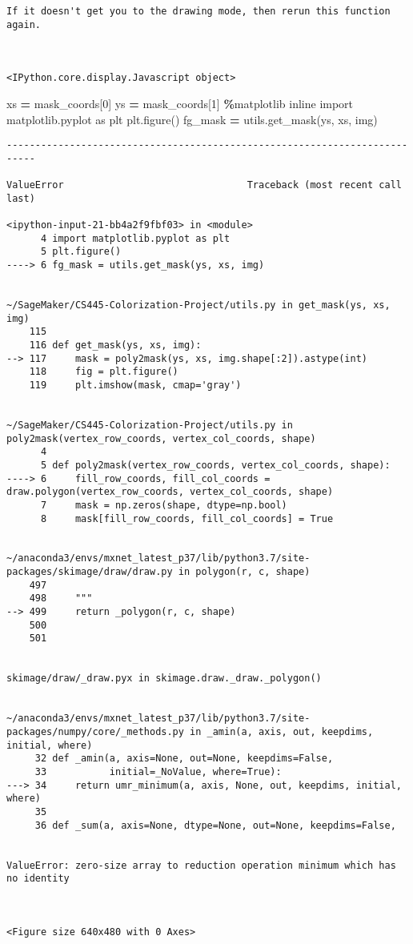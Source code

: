 \documentclass[
]{article}
\newenvironment{Shaded}{\begin{snugshade}}{\end{snugshade}}
\newcommand{\DecValTok}[1]{\textcolor[rgb]{0.00,0.00,0.81}{#1}}
\newcommand{\ImportTok}[1]{#1}
\newcommand{\NormalTok}[1]{#1}
\newcommand{\OperatorTok}[1]{\textcolor[rgb]{0.81,0.36,0.00}{\textbf{#1}}}
\begin{document}
\begin{verbatim}
If it doesn't get you to the drawing mode, then rerun this function again.



<IPython.core.display.Javascript object>
\end{verbatim}

\begin{Shaded}
\begin{Highlighting}[]
\NormalTok{xs }\OperatorTok{=}\NormalTok{ mask\_coords[}\DecValTok{0}\NormalTok{]}
\NormalTok{ys }\OperatorTok{=}\NormalTok{ mask\_coords[}\DecValTok{1}\NormalTok{]}
\OperatorTok{\%}\NormalTok{matplotlib inline}
\ImportTok{import}\NormalTok{ matplotlib.pyplot }\ImportTok{as}\NormalTok{ plt}
\NormalTok{plt.figure()}
\NormalTok{fg\_mask }\OperatorTok{=}\NormalTok{ utils.get\_mask(ys, xs, img)}
\end{Highlighting}
\end{Shaded}

\begin{verbatim}
---------------------------------------------------------------------------

ValueError                                Traceback (most recent call last)

<ipython-input-21-bb4a2f9fbf03> in <module>
      4 import matplotlib.pyplot as plt
      5 plt.figure()
----> 6 fg_mask = utils.get_mask(ys, xs, img)


~/SageMaker/CS445-Colorization-Project/utils.py in get_mask(ys, xs, img)
    115 
    116 def get_mask(ys, xs, img):
--> 117     mask = poly2mask(ys, xs, img.shape[:2]).astype(int)
    118     fig = plt.figure()
    119     plt.imshow(mask, cmap='gray')


~/SageMaker/CS445-Colorization-Project/utils.py in poly2mask(vertex_row_coords, vertex_col_coords, shape)
      4 
      5 def poly2mask(vertex_row_coords, vertex_col_coords, shape):
----> 6     fill_row_coords, fill_col_coords = draw.polygon(vertex_row_coords, vertex_col_coords, shape)
      7     mask = np.zeros(shape, dtype=np.bool)
      8     mask[fill_row_coords, fill_col_coords] = True


~/anaconda3/envs/mxnet_latest_p37/lib/python3.7/site-packages/skimage/draw/draw.py in polygon(r, c, shape)
    497 
    498     """
--> 499     return _polygon(r, c, shape)
    500 
    501 


skimage/draw/_draw.pyx in skimage.draw._draw._polygon()


~/anaconda3/envs/mxnet_latest_p37/lib/python3.7/site-packages/numpy/core/_methods.py in _amin(a, axis, out, keepdims, initial, where)
     32 def _amin(a, axis=None, out=None, keepdims=False,
     33           initial=_NoValue, where=True):
---> 34     return umr_minimum(a, axis, None, out, keepdims, initial, where)
     35 
     36 def _sum(a, axis=None, dtype=None, out=None, keepdims=False,


ValueError: zero-size array to reduction operation minimum which has no identity



<Figure size 640x480 with 0 Axes>
\end{verbatim}
\end{document}
